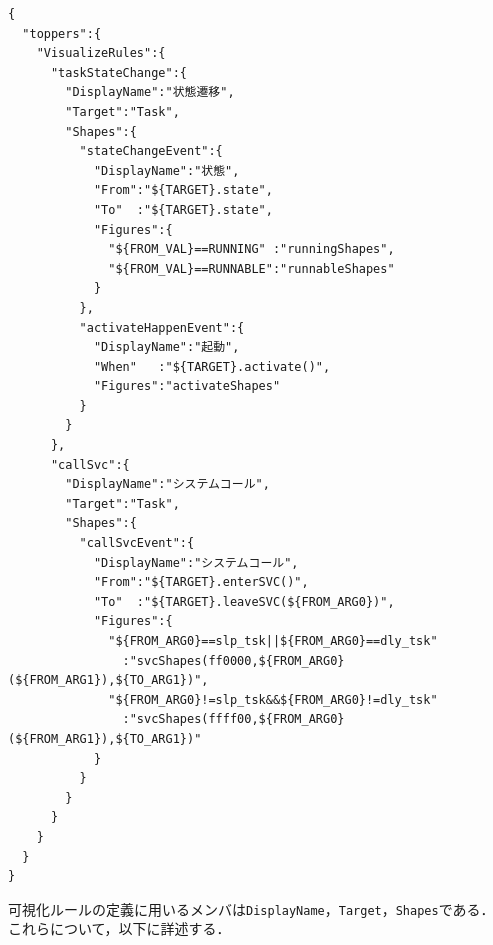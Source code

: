{\begin{table}[p]
\footnotesize
\bkcounttrue
\begin{breakbox}
\setlength{\baselineskip}{\normalbaselineskip}
\begin{verbatim}
{
  "toppers":{
    "VisualizeRules":{
      "taskStateChange":{
        "DisplayName":"状態遷移",
        "Target":"Task",
        "Shapes":{
          "stateChangeEvent":{
            "DisplayName":"状態",
            "From":"${TARGET}.state",
            "To"  :"${TARGET}.state",
            "Figures":{
              "${FROM_VAL}==RUNNING" :"runningShapes",
              "${FROM_VAL}==RUNNABLE":"runnableShapes"
            }
          },
          "activateHappenEvent":{
            "DisplayName":"起動",
            "When"   :"${TARGET}.activate()",
            "Figures":"activateShapes"
          }
        }
      },
      "callSvc":{
        "DisplayName":"システムコール",
        "Target":"Task",
        "Shapes":{
          "callSvcEvent":{
            "DisplayName":"システムコール",
            "From":"${TARGET}.enterSVC()",
            "To"  :"${TARGET}.leaveSVC(${FROM_ARG0})",
            "Figures":{
              "${FROM_ARG0}==slp_tsk||${FROM_ARG0}==dly_tsk"
                :"svcShapes(ff0000,${FROM_ARG0}(${FROM_ARG1}),${TO_ARG1})",
              "${FROM_ARG0}!=slp_tsk&&${FROM_ARG0}!=dly_tsk"
                :"svcShapes(ffff00,${FROM_ARG0}(${FROM_ARG1}),${TO_ARG1})"
            }
          }
        }
      }
    }
  }
}
\end{verbatim}
\end{breakbox}
\caption{可視化ルールファイルで可視化ルールを定義した例}
\label{visualizeRuleSample}
\end{table}}

可視化ルールの定義に用いるメンバは{\tt DisplayName}，{\tt Target}，{\tt Shapes}である．
これらについて，以下に詳述する．

